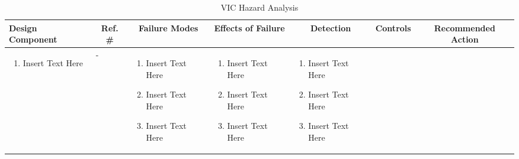 \documentclass [10pt]{article}
\begin{document}
\begingroup
\setlength\LTleft{-5.5em}
\begin{longtable}{| p{ } | p{ } | p{ } |p{ } | p{ } | p{ } | p{ }| } \caption{VIC Hazard Analysis}\\

\hline 
\rowcolor{tableCell}\centering \textbf{Design Component} & 
\multicolumn{1}{c|}{\textbf {Ref. \#}} &
\multicolumn{1}{c|}{\textbf {Failure Modes}} & 
\multicolumn{1}{c|}{\textbf {Effects of Failure}} & 
\multicolumn{1}{c|}{\textbf {Detection}} & 
\multicolumn{1}{c|}{\textbf {Controls}} & 
\multicolumn{1}{c|}{\textbf {Recommended Action}} \\ \hline


\begin{minipage}{\columnwidth}
\begin{enumerate}
\item Insert Text Here

\end{enumerate}
\end{minipage}
& 

-
& 
\begin{minipage}{\columnwidth}
\vspace{2mm}
\begin{enumerate}
\item Insert Text Here
\item Insert Text Here
\item Insert Text Here
\end{enumerate}
\end{minipage}

&
\begin{minipage}{\columnwidth}
\vspace{2mm}
\begin{enumerate}
\item Insert Text Here
\item Insert Text Here
\item Insert Text Here
\end{enumerate}
\end{minipage}


& 
\begin{minipage}{\columnwidth}
\vspace{2mm}
\begin{enumerate}
\item Insert Text Here
\item Insert Text Here
\item Insert Text Here
\end{enumerate}
\end{minipage}


\end{longtable}
\end{document}
